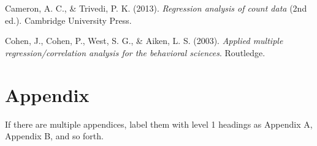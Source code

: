 \documentclass[
  man,
  floatsintext,
  colorlinks=true,linkcolor=blue,citecolor=blue,urlcolor=blue,biblatex]{apa7}
\newlength{\cslhangindent}
\newlength{\cslentryspacingunit} %
\newenvironment{CSLReferences}[2] %
 {%
  \setlength{\parindent}{0pt}
  \ifodd #1
  \let\oldpar\par
  \def\par{\hangindent=\cslhangindent\oldpar}
  \fi
  \setlength{\parskip}{#2\cslentryspacingunit}
 }%
 {}
\begin{document}
\hypertarget{refs}{}
\begin{CSLReferences}{1}{0}
\leavevmode{}%
Cameron, A. C., \& Trivedi, P. K. (2013). \emph{Regression analysis of
count data} (2nd ed.). Cambridge University Press.

\leavevmode{}%
Cohen, J., Cohen, P., West, S. G., \& Aiken, L. S. (2003). \emph{Applied
multiple regression/correlation analysis for the behavioral sciences}.
Routledge.

\end{CSLReferences}

\newpage{}

\hypertarget{appendix}{%
\section{Appendix}\label{appendix}}

If there are multiple appendices, label them with level 1 headings as
Appendix A, Appendix B, and so forth.
\end{document}
